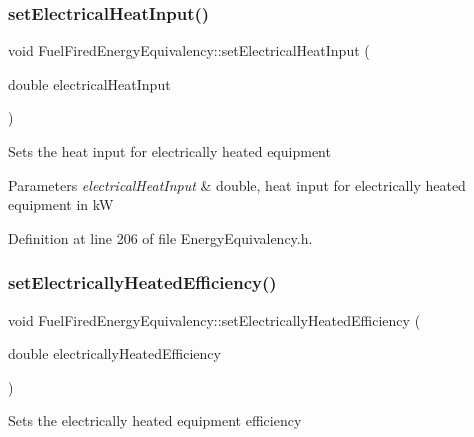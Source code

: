 \subsubsection{\texorpdfstring{set\+Electrical\+Heat\+Input()}{setElectricalHeatInput()}\hspace{0.1cm}{\footnotesize\ttfamily [3/3]}}
{\footnotesize\ttfamily void Fuel\+Fired\+Energy\+Equivalency\+::set\+Electrical\+Heat\+Input (\begin{DoxyParamCaption}\item[{double}]{electrical\+Heat\+Input }\end{DoxyParamCaption})\hspace{0.3cm}{\ttfamily [inline]}}

Sets the heat input for electrically heated equipment


\begin{DoxyParams}{Parameters}
{\em electrical\+Heat\+Input} & double, heat input for electrically heated equipment in kW \\
\hline
\end{DoxyParams}


Definition at line 206 of file Energy\+Equivalency.\+h.

\mbox{\label{class_fuel_fired_energy_equivalency_a2e8e166d9824ee07805cd790eff5e361}} 
\subsubsection{\texorpdfstring{set\+Electrically\+Heated\+Efficiency()}{setElectricallyHeatedEfficiency()}\hspace{0.1cm}{\footnotesize\ttfamily [1/3]}}
{\footnotesize\ttfamily void Fuel\+Fired\+Energy\+Equivalency\+::set\+Electrically\+Heated\+Efficiency (\begin{DoxyParamCaption}\item[{double}]{electrically\+Heated\+Efficiency }\end{DoxyParamCaption})\hspace{0.3cm}{\ttfamily [inline]}}

Sets the electrically heated equipment efficiency


